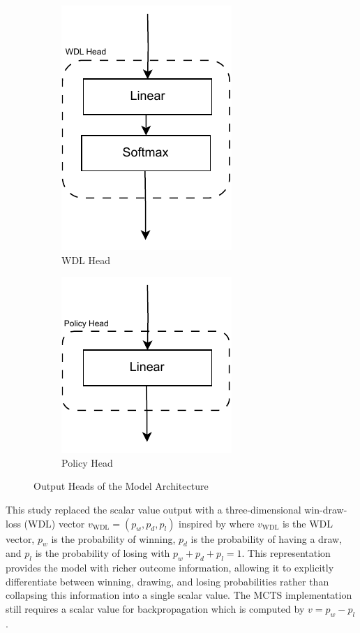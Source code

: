 \begin{figure}[H]
    \centering
    \begin{subfigure}{0.4\linewidth}
        \centering
        \includegraphics[width=0.3\linewidth]{images/WDLHead.pdf}
        \caption{WDL Head}
        \label{fig:wdl-head}
    \end{subfigure}
    \quad
    \begin{subfigure}{0.4\linewidth}
        \centering
        \includegraphics[width=0.5\linewidth]{images/PolicyHead.pdf}
        \caption{Policy Head}
        \label{fig:policy-head}
    \end{subfigure}
    \caption{Output Heads of the Model Architecture}
    \label{fig:model-output}
\end{figure}

This study %
replaced the scalar value output with a three-dimensional win-draw-loss (WDL) vector $v_{\text{WDL}} = (p_w, p_d, p_l)$ inspired by \cite{czech2024representationmattersmasteringchess} where $v_{\text{WDL}}$ is the WDL vector, $p_w$ is the probability of winning, $p_d$ is the probability of having a draw, and $p_l$ is the probability of losing with $p_w + p_d + p_l = 1$. This representation provides the model with richer outcome information, allowing it to explicitly differentiate between winning, drawing, and losing probabilities rather than collapsing this information into a single scalar value. The MCTS implementation still requires a scalar value for backpropagation which is computed by $v = p_w - p_l$.

